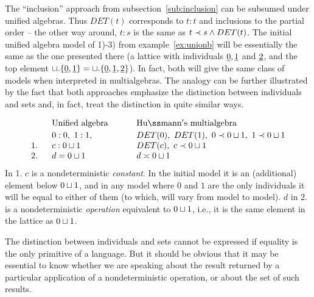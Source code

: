 {The ``inclusion'' approach from subsection~\ref{sub:inclusion} can be
subsumed under unified algebras.  Thus $DET(t)$ corresponds to $t:t$
and inclusions to the partial order -- the other way around, $t:s$ is
the same as $t\mathrel{\prec} s \land DET(t)$. The initial unified algebra model
of 1)-3) from example~\ref{ex:unionb} will be essentially the same as
the one presented there (a lattice with individuals $\underline{0}, \underline{1}$
and $\underline{2}$, and the top element $\sqcup.\{\underline{0},\underline{1}\}=\sqcup.\{\underline{0},\underline{1},\underline{2}\}$). In fact, both will give the same class of models
when interpreted in multialgebras. The analogy can be further
illustrated by the fact that both approaches emphasize the distinction
between individuals and sets and, in fact, treat the distinction in
quite similar ways.
\begin{Example}\label{ex:ind} 
\[ \begin{array}{r@{\ \ \ \ \ }l@{\ \ \ \ \ \ \ \ \ \ }l}
  &	       {\rm Unified\ algebra} &       {\rm  Hu{\ss}mann's\ 
  multialgebra} \\[.5ex]
 & 		 0:0,\ 1:1, 		& DET(0),\ DET(1), \ 0\Incl 
 0\ch 1,\  1\Incl 0\ch 1 \\
	1.  &	  c: 0\ch 1	&		  DET(c),\ c\Incl 0\ch 1 \\
	2.  &	  d=0\ch 1	& 		  d\seteq 0\ch 1
\end{array} \]
In 1.  $c$ is a nondeterministic {\em constant}. In the initial model it is an 
(additional) element below $0\sqcup 1$, 
and in any model where $0$ and $1$ are the only individuals it will be equal to either of them (to 
which, will vary from model to model). $d$ in 2. is a nondeterministic 
{\em operation} equivalent to $0\sqcup 1$, 
i.e., it is the same element in the lattice as $0\sqcup 1$. 
\end{Example}

The distinction between individuals and sets cannot be expressed if
equality is the only primitive of a language. But it should be obvious
that it may be essential to know whether we are speaking about the
result returned by a particular application of a nondeterministic 
operation, or about the set of such results.

}
